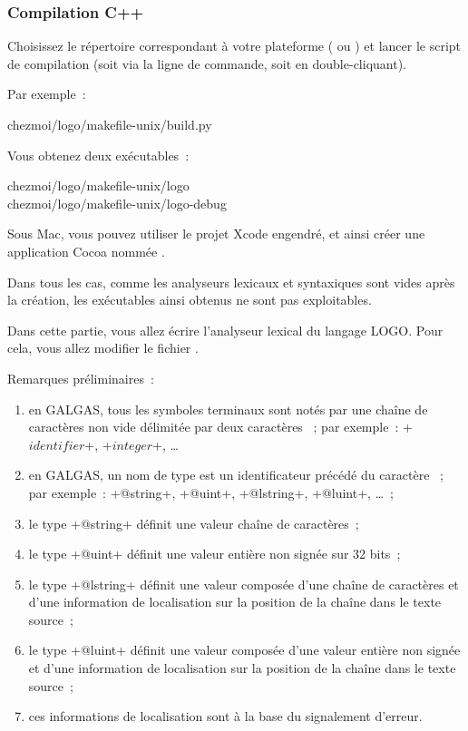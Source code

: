 \subsubsection{Compilation C++}
Choisissez le répertoire correspondant à votre plateforme ( ou ) et lancer le script de compilation  (soit via la ligne de commande, soit en double-cliquant).

Par exemple~:
\begin{SHELL}
chezmoi/logo/makefile-unix/build.py
\end{SHELL}

Vous obtenez deux exécutables~:
\begin{SHELL}
chezmoi/logo/makefile-unix/logo\\
chezmoi/logo/makefile-unix/logo-debug
\end{SHELL}

Sous Mac, vous pouvez utiliser le projet Xcode engendré, et ainsi créer une application Cocoa nommée .

Dans tous les cas, comme les analyseurs lexicaux et syntaxiques sont vides après la création, les exécutables ainsi obtenus ne sont pas exploitables.




Dans cette partie, vous allez écrire l’analyseur lexical du langage LOGO. Pour cela, vous allez modifier le fichier .

Remarques préliminaires~:
\begin{enumerate}
  \item en GALGAS, tous les symboles terminaux sont notés par une chaîne de caractères non vide délimitée par deux caractères \tpp{\$}~; par exemple~: \ggst+$identifier$+, \ggst+$integer$+, …
  \item en GALGAS, un nom de type est un identificateur précédé du caractère ~; par exemple~: \ggst+@string+, \ggst+@uint+, \ggst+@lstring+, \ggst+@luint+, …~;
  \item le type \ggst+@string+ définit une valeur chaîne de caractères~;
  \item le type \ggst+@uint+ définit une valeur entière non signée sur 32 bits~;
  \item le type \ggst+@lstring+ définit une valeur composée d'une chaîne de caractères et d'une information de localisation sur la position de la chaîne dans le texte source~;
  \item le type \ggst+@luint+ définit une valeur composée d'une valeur entière non signée et d'une information de localisation sur la position de la chaîne dans le texte source~;
  \item ces informations de localisation sont à la base du signalement d'erreur.
\end{enumerate}

